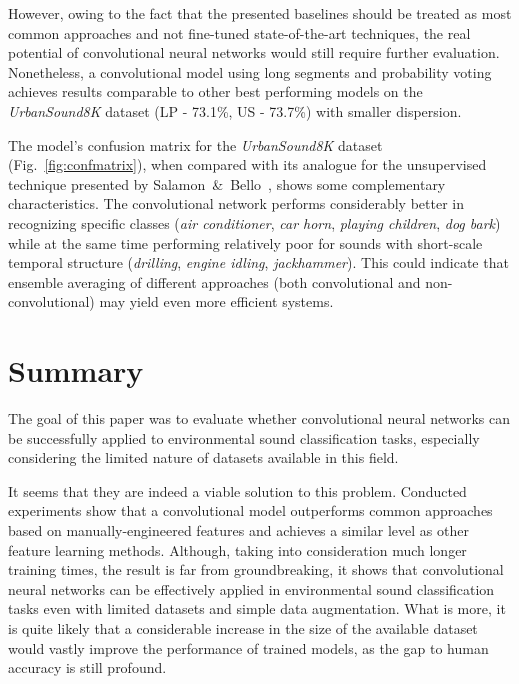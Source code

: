 \documentclass{article}
\begin{document}
However, owing to the fact that the presented baselines should be treated as most common approaches and not fine-tuned state-of-the-art techniques, the real potential of convolutional neural networks would still require further evaluation. Nonetheless, a convolutional model using long segments and probability voting achieves results comparable to other best performing models on the \textit{UrbanSound8K} dataset (LP - 73.1\%, US - 73.7\%) with smaller dispersion. 

The model's confusion matrix for the \textit{UrbanSound8K} dataset (Fig.~\ref{fig:confmatrix}), when compared with its analogue for the unsupervised technique presented by Salamon~\&~Bello~\cite{salamon2015unsupervised}, shows some complementary characteristics. The convolutional network performs considerably better in recognizing specific classes (\textit{air conditioner}, \textit{car horn}, \textit{playing children}, \textit{dog bark}) while at the same time performing relatively poor for sounds with short-scale temporal structure (\textit{drilling}, \textit{engine idling}, \textit{jackhammer}). This could indicate that ensemble averaging of different approaches (both convolutional and non-convolutional) may yield even more efficient systems.

\section{Summary}

The goal of this paper was to evaluate whether convolutional neural networks can be successfully applied to environmental sound classification tasks, especially considering the limited nature of datasets available in this field.


It seems that they are indeed a viable solution to this problem. Conducted experiments show that a convolutional model outperforms common approaches based on manually-engineered features and achieves a similar level as other feature learning methods. Although, taking into consideration much longer training times, the result is far from groundbreaking, it shows that convolutional neural networks can be effectively applied in environmental sound classification tasks even with limited datasets and simple data augmentation. What is more, it is quite likely that a considerable increase in the size of the available dataset would vastly improve the performance of trained models, as the gap to human accuracy is still profound.
\end{document}
